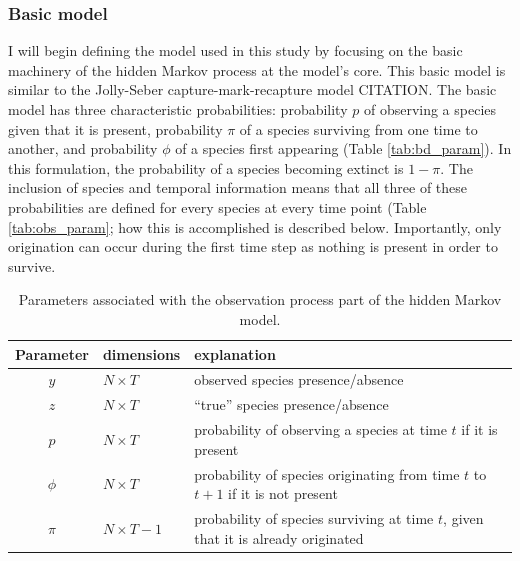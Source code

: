 \documentclass[12pt,letterpaper]{article}
\begin{document}
\subsubsection*{Basic model}
I will begin defining the model used in this study by focusing on the basic machinery of the hidden Markov process at the model's core. This basic model is similar to the Jolly-Seber capture-mark-recapture model CITATION.
The basic model has three characteristic probabilities: probability \(p\) of observing a species given that it is present, probability \(\pi\) of a species surviving from one time to another, and probability \(\phi\) of a species first appearing \citep{Royle2008} (Table \ref{tab:bd_param}). In this formulation, the probability of a species becoming extinct is \(1 - \pi\). The inclusion of species and temporal information means that all three of these probabilities are defined for every species at every time point (Table \ref{tab:obs_param}; how this is accomplished is described below. Importantly, only origination can occur during the first time step as nothing is present in order to survive.

\begin{table}
  \centering
  \caption{Parameters associated with the observation process part of the hidden Markov model.}
  \begin{tabular}{c l l}
    Parameter & dimensions & explanation \\
    \hline
    \(y\) & \(N \times T\) & observed species presence/absence \\
    \(z\) & \(N \times T\) & ``true'' species presence/absence \\
    \(p\) & \(N \times T\) & probability of observing a species at time \(t\) if it is present \\
    \(\phi\) & \(N \times T\) & probability of species originating from time \(t\) to \(t + 1\) if it is not present \\
    \(\pi\) & \(N \times T - 1\) & probability of species surviving at time \(t\), given that it is already originated \\
  \end{tabular}
  \label{tab:basic}
\end{table}
\end{document}
